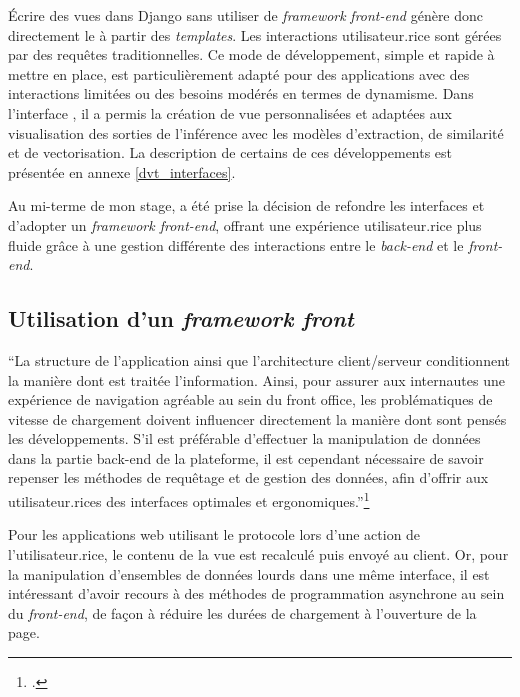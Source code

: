 Écrire des vues dans Django sans utiliser de \textit{framework} \emph{front-end} génère
donc directement le \html à partir des \textit{templates}. Les interactions
utilisateur.rice sont gérées par des requêtes \http traditionnelles. Ce mode
de développement, simple et rapide à mettre en place, est
particulièrement adapté pour des applications avec des interactions
limitées ou des besoins modérés en termes de dynamisme. Dans l'interface \eida, il a
permis la création de vue personnalisées et adaptées aux visualisation
des sorties de l'inférence avec les modèles d'extraction, de similarité
et de vectorisation. La description de certains de ces développements est présentée en annexe \ref{dvt_interfaces}. 

Au mi-terme de mon stage, a été prise la décision de refondre les
interfaces et d'adopter un \emph{framework front-end}, offrant une
expérience utilisateur.rice plus fluide grâce à une gestion différente des
interactions entre le \textit{back-end} et le \textit{front-end}.

\hypertarget{utilisation-dun-framework-front}{%
\subsection{Utilisation d'un \emph{framework
front}}\label{utilisation-dun-framework-front}}

\begin{kwote}
``La structure de l'application ainsi que l'architecture client/serveur
conditionnent la manière dont est traitée l'information. Ainsi, pour
assurer aux internautes une expérience de navigation agréable au sein du
front office, les problématiques de vitesse de chargement doivent
influencer directement la manière dont sont pensés les développements.
S'il est préférable d'effectuer la manipulation de données dans la
partie back-end de la plateforme, il est cependant nécessaire de savoir
repenser les méthodes de requêtage et de gestion des données, afin
d'offrir aux utilisateur.rices des interfaces optimales et
ergonomiques.''\footcite[p.97]{albouy_mediation_2019}
\end{kwote}

Pour les applications web utilisant le protocole \http lors d'une action
de l'utilisateur.rice, le contenu de la vue est recalculé puis envoyé au
client. Or, pour la manipulation d'ensembles de données lourds dans une
même interface, il est intéressant d'avoir recours à des méthodes de
programmation asynchrone au sein du \textit{front-end}, de façon à réduire les
durées de chargement à l'ouverture de la page.

